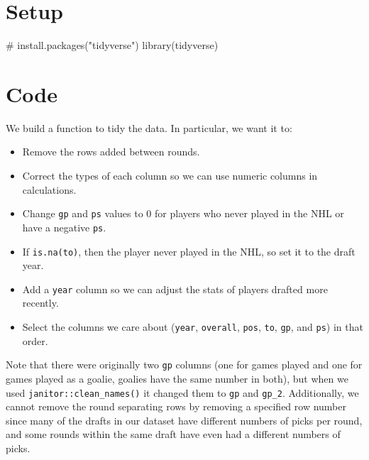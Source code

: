 \documentclass[
  letterpaper,
  DIV=11,
  numbers=noendperiod]{scrreprt}
\newenvironment{Shaded}{\begin{snugshade}}{\end{snugshade}}
\newcommand{\CommentTok}[1]{\textcolor[rgb]{0.37,0.37,0.37}{#1}}
\newcommand{\FunctionTok}[1]{\textcolor[rgb]{0.28,0.35,0.67}{#1}}
\newcommand{\NormalTok}[1]{\textcolor[rgb]{0.00,0.23,0.31}{#1}}
\begin{document}
\section{Setup}\label{setup-1}

\begin{Shaded}
\begin{Highlighting}[]
\CommentTok{\# install.packages("tidyverse")}
\FunctionTok{library}\NormalTok{(tidyverse)}
\end{Highlighting}
\end{Shaded}

\section{Code}\label{code-1}

We build a function to tidy the data. In particular, we want it to:

\begin{itemize}
\item
  Remove the rows added between rounds.
\item
  Correct the types of each column so we can use numeric columns in
  calculations.
\item
  Change \texttt{gp} and \texttt{ps} values to 0 for players who never
  played in the NHL or have a negative \texttt{ps}.
\item
  If \texttt{is.na(to)}, then the player never played in the NHL, so set
  it to the draft year.
\item
  Add a \texttt{year} column so we can adjust the stats of players
  drafted more recently.
\item
  Select the columns we care about (\texttt{year}, \texttt{overall},
  \texttt{pos}, \texttt{to}, \texttt{gp}, and \texttt{ps}) in that
  order.
\end{itemize}

Note that there were originally two \texttt{gp} columns (one for games
played and one for games played as a goalie, goalies have the same
number in both), but when we used \texttt{janitor::clean\_names()} it
changed them to \texttt{gp} and \texttt{gp\_2}. Additionally, we cannot
remove the round separating rows by removing a specified row number
since many of the drafts in our dataset have different numbers of picks
per round, and some rounds within the same draft have even had a
different numbers of picks.
\end{document}
